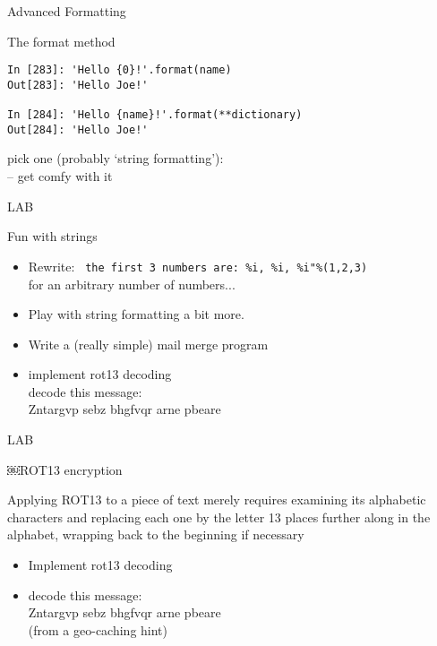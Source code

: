 \documentclass{beamer}
\begin{document}
\begin{frame}[fragile]{Advanced Formatting}

{\Large The format method}

\begin{verbatim}
In [283]: 'Hello {0}!'.format(name)
Out[283]: 'Hello Joe!'

In [284]: 'Hello {name}!'.format(**dictionary)
Out[284]: 'Hello Joe!'
\end{verbatim}
\vfill
{\Large pick one (probably ‘string formatting’): \\
  -- get comfy with it }

\end{frame}


\begin{frame}[fragile]{LAB}

{\Large Fun with strings}

\begin{itemize}
  \item Rewrite: \verb| the first 3 numbers are: %i, %i, %i"%(1,2,3)| \\
        for an arbitrary number of numbers...
  \item Play with string formatting a bit more.
  \item Write a (really simple) mail merge program
  \item implement rot13 decoding \\
     \hspace{0.5in} decode this message: \\
     \hspace{0.5in} Zntargvp sebz bhgfvqr arne pbeare
\end{itemize}

\end{frame}

\begin{frame}[fragile]{LAB}


{\center

\Large￼ROT13 encryption

}
\vfill
Applying ROT13 to a piece of text merely requires examining its alphabetic
characters and replacing each one by the letter 13 places further along in
the alphabet, wrapping back to the beginning if necessary

\begin{itemize}
  \item Implement rot13 decoding 
  \item  decode this message: \\
     \hspace{0.5in} Zntargvp sebz bhgfvqr arne pbeare \\
     \hspace{0.5in} (from a geo-caching hint)
\end{itemize}

\end{frame}
\end{document}
